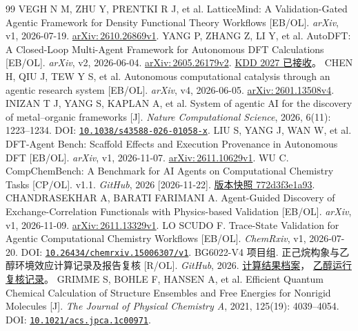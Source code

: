 \documentclass[UTF8,a4paper,11pt,fontset=fandol]{ctexart}
\newcommand{\doi}[1]{\href{https://doi.org/#1}{\nolinkurl{#1}}}
\newcommand{\ax}[1]{\href{https://arxiv.org/abs/#1}{arXiv:\,#1}}
\begin{document}
\begin{thebibliography}{99}
  VEGH N M, ZHU Y, PRENTKI R J, et al.
  LatticeMind: A Validation-Gated Agentic Framework for Density Functional Theory
  Workflows [EB/OL].
  \emph{arXiv}, v1, 2026-07-19.
  \ax{2610.26869v1}.
  YANG P, ZHANG Z, LI Y, et al.
  AutoDFT: A Closed-Loop Multi-Agent Framework for Autonomous DFT Calculations [EB/OL].
  \emph{arXiv}, v2, 2026-06-04.
  \ax{2605.26179v2}.
  \href{https://phyang.top/}{KDD 2027 已接收}。
  CHEN H, QIU J, TEW Y S, et al.
  Autonomous computational catalysis through an agentic research system [EB/OL].
  \emph{arXiv}, v4, 2026-06-05.
  \ax{2601.13508v4}.
  INIZAN T J, YANG S, KAPLAN A, et al.
  System of agentic AI for the discovery of metal--organic frameworks [J].
  \emph{Nature Computational Science}, 2026, 6(11): 1223--1234.
  DOI: \doi{10.1038/s43588-026-01058-x}.
  LIU S, YANG J, WAN W, et al.
  DFT-Agent Bench: Scaffold Effects and Execution Provenance in Autonomous DFT [EB/OL].
  \emph{arXiv}, v1, 2026-11-07.
  \ax{2611.10629v1}.
  WU C.
  CompChemBench: A Benchmark for AI Agents on Computational Chemistry Tasks [CP/OL].
  v1.1. \emph{GitHub}, 2026 [2026-11-22].
  \href{https://github.com/Chenghao-Wu/compchem-bench/tree/772d3f3e1a93}{版本快照 772d3f3e1a93}.
  CHANDRASEKHAR A, BARATI FARIMANI A.
  Agent-Guided Discovery of Exchange-Correlation Functionals with Physics-based Validation
  [EB/OL].
  \emph{arXiv}, v1, 2026-11-09.
  \ax{2611.13329v1}.
  LO SCUDO F.
  Trace-State Validation for Agentic Computational Chemistry Workflows [EB/OL].
  \emph{ChemRxiv}, v1, 2026-07-20.
  DOI: \doi{10.26434/chemrxiv.15006307/v1}.
  BG6022-V4 项目组.
  正己烷构象与乙醇环境效应计算记录及报告复核 [R/OL].
  \emph{GitHub}, 2026.
  \href{https://github.com/az87988799/BG6022-v4/blob/1e8795b0b10deb8f288eccb9d95befb742958ff9/FinalReport-LaTeX/sections/06a-calculation-results.tex}
    {计算结果档案}，%
  \href{https://github.com/az87988799/BG6022-v4/blob/1eefccdb742ed81692900f9660a8db950ae1f273/docs/acceptance/live-failure-repair-20261021/repair-report.md}
    {乙醇运行复核记录}。
  GRIMME S, BOHLE F, HANSEN A, et al.
  Efficient Quantum Chemical Calculation of Structure Ensembles and Free Energies for
  Nonrigid Molecules [J].
  \emph{The Journal of Physical Chemistry A}, 2021, 125(19): 4039--4054.
  DOI: \doi{10.1021/acs.jpca.1c00971}.
\end{thebibliography}
\endgroup

\clearpage
\appendix
\setcounter{table}{0}
\renewcommand{\thetable}{\Alph{section}.\arabic{table}}
\renewcommand{\theHtable}{appendix.\Alph{section}.\arabic{table}}
\end{document}

